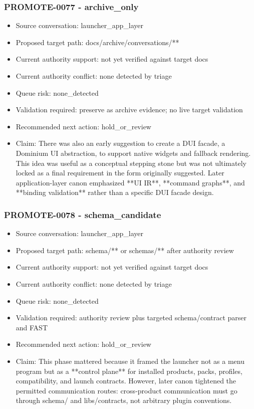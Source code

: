 \documentclass[11pt,a4paper]{report}
\begin{document}
\subsubsection{PROMOTE-0077 - archive\_only}

\begin{itemize}
\item Source conversation: launcher\_app\_layer
\item Proposed target path: docs/archive/conversations/**
\item Current authority support: not yet verified against target docs
\item Current authority conflict: none detected by triage
\item Queue risk: none\_detected
\item Validation required: preserve as archive evidence; no live target validation
\item Recommended next action: hold\_or\_review
\item Claim: There was also an early suggestion to create a DUI facade, a Dominium UI abstraction, to support native widgets and fallback rendering. This idea was useful as a conceptual stepping stone but was not ultimately locked as a final requirement in the form originally suggested. Later application-layer canon emphasized **UI IR**, **command graphs**, and **binding validation** rather than a specific DUI facade design.
\end{itemize}

\subsubsection{PROMOTE-0078 - schema\_candidate}

\begin{itemize}
\item Source conversation: launcher\_app\_layer
\item Proposed target path: schema/** or schemas/** after authority review
\item Current authority support: not yet verified against target docs
\item Current authority conflict: none detected by triage
\item Queue risk: none\_detected
\item Validation required: authority review plus targeted schema/contract parser and FAST
\item Recommended next action: hold\_or\_review
\item Claim: This phase mattered because it framed the launcher not as a menu program but as a **control plane** for installed products, packs, profiles, compatibility, and launch contracts. However, later canon tightened the permitted communication routes: cross-product communication must go through schema/ and libs/contracts, not arbitrary plugin conventions.
\end{itemize}
\end{document}
